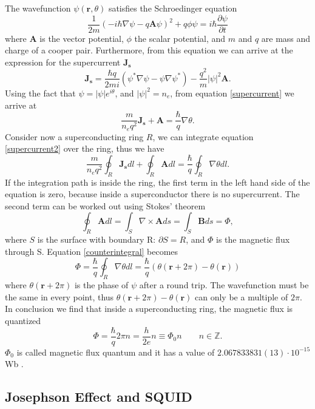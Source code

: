 \documentclass[a4paper,10pt]{article}
\begin{document}
The wavefunction $\psi(\mathbf{r},\theta)$ satisfies the Schroedinger equation \cite{fluxquantization}
\begin{equation}\frac{1}{2m}\left(-i\hbar\nabla\psi - q\mathbf{A}\psi \right)^2 + q\phi \psi = i\hbar\frac{\partial \psi }{\partial t}\end{equation}
where $\mathbf{A}$ is the vector potential, $\phi$ the scalar potential, and $m$ and $q$ are mass and charge of a cooper pair. Furthermore, from this equation we can arrive at the expression for the supercurrent $\mathbf{J_s}$
\begin{equation}\label{supercurrent}\mathbf{J_s} = \frac{\hbar q}{2mi}\left(\psi^* \nabla \psi - \psi \nabla \psi^*\right) -\frac{q^2}{m}|\psi|^2\mathbf{A}.\end{equation}
Using the fact that $\psi = |\psi| e^{i\theta}$, and $|\psi|^2 = n_e$, from equation \eqref{supercurrent} we arrive at
\begin{equation}\label{supercurrent2}
\frac{m}{n_eq^2} \mathbf{J_s} + \mathbf{A} = \frac{\hbar}{q}\nabla\theta.
\end{equation}
Consider now a superconducting ring $R$, we can integrate equation \eqref{supercurrent2} over the ring, thus we have
\begin{equation}\label{counterintegral}\frac{m}{n_eq^2}\oint_R \mathbf{J_s} dl + \oint_R \mathbf{A}dl = \frac{\hbar}{q}\oint_R\nabla\theta dl.\end{equation}
If the integration path is inside the ring, the first term in the left hand side of the equation is zero, because inside a superconductor there is no supercurrent. The second term can be worked out using Stokes' theorem
\[\oint_R \mathbf{A}dl = \int_S \nabla \times \mathbf{\mathbf{A}}ds = \int_S \mathbf{B} ds = \Phi,\]
where $S$ is the surface with boundary R: $\partial S = R$, and $\Phi$ is the magnetic flux through S. Equation \eqref{counterintegral} becomes
\[\Phi = \frac{\hbar}{q}\oint_R\nabla\theta dl = \frac{\hbar}{q}\left(\theta(\mathbf{r}+2\pi) - \theta(\mathbf{r})\right)\]
where $\theta(\mathbf{r}+2\pi)$ is the phase of $\psi$ after a round trip. The wavefunction must be the same in every point, thus $\theta(\mathbf{r}+2\pi) - \theta(\mathbf{r})$ can only be a multiple of $2\pi$. In conclusion we find that inside a superconducting ring, the magnetic flux is quantized
\[\Phi = \frac{\hbar}{q} 2\pi n = \frac{h}{2e} n \equiv \Phi_0 n \qquad n\in \mathbb{Z}.\]
$\Phi_0$ is called magnetic flux quantum and it has a value of $2.067833831(13)\cdot 10^{-15}$ Wb \cite{magneticfluxquantum}.
\subsection{Josephson Effect and SQUID} %
\end{document}

